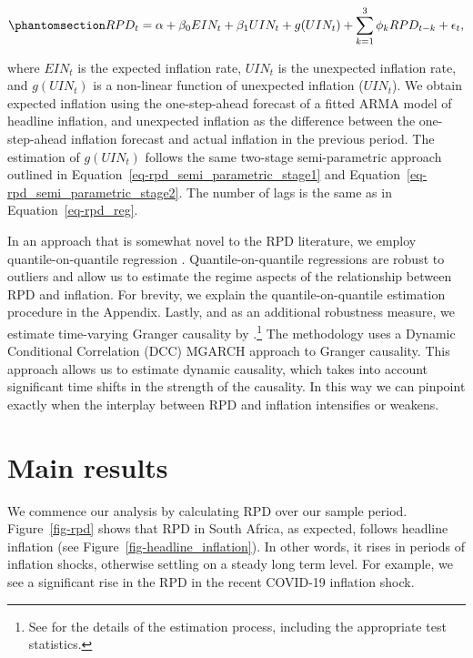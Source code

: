 \documentclass[
  letterpaper,
  DIV=11,
  numbers=noendperiod]{scrartcl}
\begin{document}
\begin{equation}\phantomsection\label{eq-unexpected}{ RPD_t = \alpha + \beta_0 EIN_t + \beta_1 UIN_t + g(UIN_t) + \sum_{k=1}^{3}\phi_k RPD_{t-k} + \epsilon_t, }\end{equation}

where \(EIN_t\) is the expected inflation rate, \(UIN_t\) is the
unexpected inflation rate, and \(g(UIN_t)\) is a non-linear function of
unexpected inflation (\(UIN_t\)). We obtain expected inflation using the
one-step-ahead forecast of a fitted ARMA model of headline inflation,
and unexpected inflation as the difference between the one-step-ahead
inflation forecast and actual inflation in the previous period. The
estimation of \(g(UIN_t)\) follows the same two-stage semi-parametric
approach outlined in Equation~\ref{eq-rpd_semi_parametric_stage1} and
Equation~\ref{eq-rpd_semi_parametric_stage2}. The number of lags is the
same as in Equation~\ref{eq-rpd_reg}.

In an approach that is somewhat novel to the RPD literature, we employ
quantile-on-quantile regression \citep{koenker2017}.
Quantile-on-quantile regressions are robust to outliers and allow us to
estimate the regime aspects of the relationship between RPD and
inflation. For brevity, we explain the quantile-on-quantile estimation
procedure in the Appendix. Lastly, and as an additional robustness
measure, we estimate time-varying Granger causality by
\citet{lu2014}.\footnote{See \citet{lu2014} for the details of the
  estimation process, including the appropriate test statistics.} The
\citet{lu2014} methodology uses a Dynamic Conditional Correlation (DCC)
MGARCH approach to Granger causality. This approach allows us to
estimate dynamic causality, which takes into account significant time
shifts in the strength of the causality. In this way we can pinpoint
exactly when the interplay between RPD and inflation intensifies or
weakens.

\section{Main results}\label{main-results}

We commence our analysis by calculating RPD over our sample period.
Figure~\ref{fig-rpd} shows that RPD in South Africa, as expected,
follows headline inflation (see Figure~\ref{fig-headline_inflation}). In
other words, it rises in periods of inflation shocks, otherwise settling
on a steady long term level. For example, we see a significant rise in
the RPD in the recent COVID-19 inflation shock.
\end{document}
